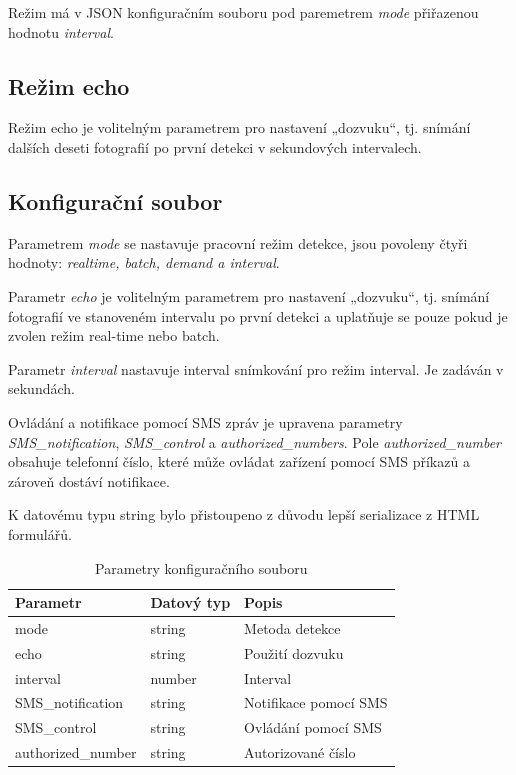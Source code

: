 Režim má v JSON konfiguračním souboru pod paremetrem \textit{mode} přiřazenou hodnotu \textit{interval}.

\subsection*{Režim echo}
Režim echo je volitelným parametrem pro nastavení „dozvuku“, tj. snímání dalších deseti fotografií po první detekci v sekundových intervalech.

\subsection*{Konfigurační soubor}
Parametrem \textit{mode} se nastavuje pracovní režim detekce, jsou povoleny čtyři hodnoty: \textit{realtime, batch, demand a interval}.

Parametr \textit{echo} je volitelným parametrem pro nastavení  „dozvuku“, tj. snímání fotografií ve stanoveném intervalu po první detekci a uplatňuje se pouze pokud je zvolen režim real-time nebo batch.

Parametr \textit{interval} nastavuje interval snímkování pro režim interval. Je zadáván v sekundách.

Ovládání a notifikace pomocí SMS zpráv je upravena parametry \textit{SMS\_notification}, \textit{SMS\_control} a \textit{authorized\_numbers}. Pole \textit{authorized\_number} obsahuje telefonní číslo, které může ovládat zařízení pomocí SMS příkazů a zároveň dostáví notifikace.

K datovému typu string bylo přistoupeno z důvodu lepší serializace z HTML formulářů.

\begin{table}[h]
\centering
\caption{Parametry konfiguračního souboru}
\label{}
\begin{tabular}{|l|l|l|}
\hline
\textbf{Parametr}  & \textbf{Datový typ} & \textbf{Popis}                 \\ \hline
mode               & string              & Metoda detekce                 \\ \hline
echo               & string             & Použití dozvuku        \\ \hline
interval              & number             & Interval        \\ \hline
SMS\_notification  & string             & Notifikace pomocí SMS          \\ \hline
SMS\_control       & string             & Ovládání pomocí SMS            \\ \hline
authorized\_number & string              & Autorizované číslo              \\ \hline
\end{tabular}
\end{table}

